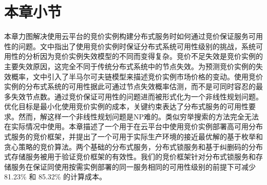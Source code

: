 \section{本章小节}
\label{sec:jupiter-conclusion}
本章力图解决使用云平台的竞价实例构建分布式服务时如何通过竞价保证服务可用性的问题。文中指出了使用竞价实例时保证分布式系统可用性级别的挑战，系统可用性的分析因为竞价实例失效模型的不同而变得复杂。竞价不足失效是竞价实例的主要失效原因，这完全不同于传统分布式系统中的节点失效。为预测竞价实例的失效概率，文中引入了半马尔可夫链模型来描述竞价实例市场价格的变动。使用竞价实例的分布式系统的可用性据此可通过节点失效概率估测，而不是可同时容忍的最多失效节点数。通过竞价保证可用性的问题进而被形式化为一个非线性规划问题。优化目标是最小化使用竞价实例的成本，关键约束表达了分布式服务的可用性要求。然而，解这样一个非线性规划问题是NP难的。类似穷举搜索的方法完全无法在实际情况中使用。本章描述了一个用于在云平台中使用竞价实例部署高可用分布式服务的竞价框架，并提出了一个可用于实际生产环境的接近最优解的基于枚举和贪心策略的竞价算法。两个基础的分布式服务，分布式锁服务和基于纠删码的分布式存储服务被用于验证竞价框架的有效性。我们的竞价框架针对分布式锁服务和存储服务在保证同使用按需实例部署的同一服务相同的可用性级别的前提下可减少81.23\% 和 85.32\% 的计算成本。
